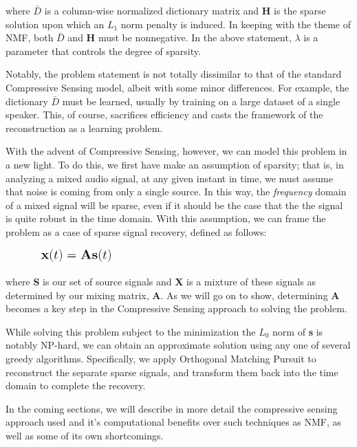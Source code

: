 \documentclass{article}
\begin{document}
where \textbf{$\bar{D}$} is a column-wise normalized dictionary matrix and \textbf{H} is the sparse solution upon which an $L_{1}$ norm penalty is induced. In keeping with the theme of NMF, both $\bar{D}$ and \textbf{H} must be nonnegative. In the above statement, $\lambda$ is a parameter that controls the degree of sparsity.

Notably, the problem statement is not totally dissimilar to that of the standard Compressive Sensing model, albeit with some minor differences. For example, the dictionary $\bar{D}$ must be learned, usually by training on a large dataset of a single speaker. This, of course, sacrifices efficiency and casts the framework of the reconstruction as a learning problem.  

With the advent of Compressive Sensing, however, we can model this problem in a new light. To do this, we first have make an assumption of sparsity; that is, in analyzing a mixed audio signal, at any given instant in time, we must assume that noise is coming from only a single source. In this way, the {\it frequency} domain of a mixed signal will be sparse, even if it should be the case that the the signal is quite robust in the time domain. With this assumption, we can frame the problem as a case of sparse signal recovery, defined as follows:

\begin{figure}[H]
	\centering
	\includegraphics[width=94pt, height=15pt]{figs/compressive.png}
	\label{Compressive Sensing Problem Statement}
\end{figure}

where \textbf{S} is our set of source signals and \textbf{X} is a mixture of these signals as determined by our mixing matrix, \textbf{A}. As we will go on to show, determining \textbf{A} becomes a key step in the Compressive Sensing approach to solving the problem.

While solving this problem subject to the minimization the $L_{0}$ norm of \textbf{s} is notably NP-hard, we can obtain an approximate solution using any one of several greedy algorithms. Specifically, we apply Orthogonal Matching Pursuit to reconstruct the separate sparse signals, and transform them back into the time domain to complete the recovery.

In the coming sections, we will describe in more detail the compressive sensing approach used and it's computational benefits over such techniques as NMF, as well as some of its own shortcomings.
\end{document}
